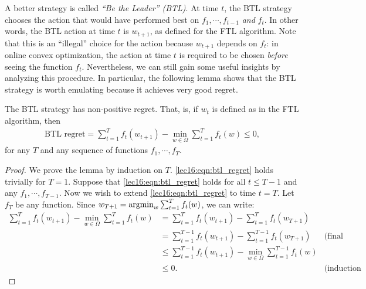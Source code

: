 


A better strategy is called \textit{``Be the Leader'' (BTL)}.  At time $t$, the BTL strategy chooses the action that would have performed best on $f_1, \cdots, f_{t-1}$ \textit{and} $f_t$.  In other words, the BTL action at time $t$ is $w_{t+1}$, as defined for the FTL algorithm. Note that this is an ``illegal'' choice for the action because $w_{t+1}$ depends on $f_t$: in online convex optimization, the action at time $t$ is required to be chosen \textit{before} seeing the function $f_t$.  Nevertheless, we can still gain some useful insights by analyzing this procedure. In particular, the following lemma shows that the BTL strategy is worth emulating because it achieves very good regret.

\begin{lemma}\label{lec16:lem:btl_regret}
The BTL strategy has non-positive regret. That, is, if $w_t$ is defined as in the FTL algorithm, then
\begin{align}
\text{BTL regret} = \sum_{t = 1}^T f_t(w_{t + 1}) - \min_{w \in \Omega} \sum_{t = 1}^T f_t(w) \leq 0, \label{lec16:eqn:btl_regret}
\end{align}
for any $T$ and any sequence of functions $f_1, \cdots, f_T$.
\end{lemma}

\begin{proof}
We prove the lemma by induction on $T$. \eqref{lec16:eqn:btl_regret} holds trivially for $T = 1$. Suppose that \eqref{lec16:eqn:btl_regret} holds for all $t \leq T - 1$ and any $f_1, \cdots, f_{T-1}$.  Now we wish to extend \eqref{lec16:eqn:btl_regret} to time $t = T$.  Let $f_T$ be any function.  Since $w_{T+1} = \operatorname*{\textup{argmin}}_w \sum_{t = 1}^T f_t(w)$, we can write:
\begin{align}
\sum_{t = 1}^{T} f_t(w_{t+1}) - \min_{w \in \Omega} \sum_{t = 1}^{T} f_t(w) &= \sum_{t = 1}^T f_t(w_{t+1}) - \sum_{t = 1}^T f_t(w_{T+1})\\
&= \sum_{t = 1}^{T - 1} f_t(w_{t+1}) - \sum_{t = 1}^{T - 1} f_t(w_{T+1}) &\text{(final summands cancel)}\\
&\leq \sum_{t = 1}^{T - 1} f_t(w_{t+1}) - \min_{w \in \Omega} \sum_{t = 1}^{T - 1} f_t(w)\\
&\leq 0. &\text{(induction hypothesis)}
\end{align}
\end{proof}

